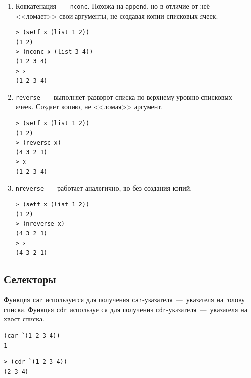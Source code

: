 \begin{enumerate} 
\item Конкатенация~---~\texttt{nconc}. Похожа на \texttt{append}, но в отличие от неё <<ломает>> свои аргументы, не создавая копии списковых ячеек.

\begin{code}
\begin{verbatim}
> (setf x (list 1 2))
(1 2)
> (nconc x (list 3 4))
(1 2 3 4)
> x
(1 2 3 4)
\end{verbatim}
\end{code}

\item \texttt{reverse}~---~выполняет разворот списка по верхнему уровню списковых ячеек. Создает копию, не <<ломая>> аргумент. 

\begin{code}
\begin{verbatim}
> (setf x (list 1 2))
(1 2)
> (reverse x)
(4 3 2 1)
> x
(1 2 3 4)
\end{verbatim}
\end{code}

\item \texttt{nreverse}~---~работает аналогично, но без создания копий.

\begin{code}
\begin{verbatim}
> (setf x (list 1 2))
(1 2)
> (nreverse x)
(4 3 2 1)
> x
(4 3 2 1)
\end{verbatim}
\end{code}
\end{enumerate}

\subsection{Селекторы}
Функция \texttt{car} используется для получения \texttt{car}-указателя~---~указателя на голову списка. Функция \texttt{cdr} используется для получения \texttt{cdr}-указателя~---~указателя на хвост списка.

\begin{code}
\begin{verbatim}
(car `(1 2 3 4))
1
\end{verbatim}
\end{code}

\begin{code}
\begin{verbatim}
> (cdr `(1 2 3 4))
(2 3 4)
\end{verbatim}
\end{code}

